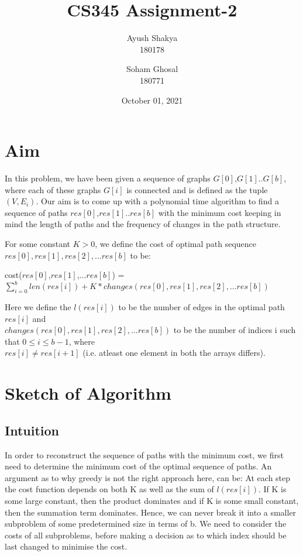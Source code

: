 \documentclass{article}
\title{CS345 Assignment-2}
\author{Ayush Shakya \\180178 \and Soham Ghosal \\180771}
\date{October 01, 2021}
\begin{document}
\maketitle

\vspace{0.25cm}
\section{Aim}
In this problem, we have been given a sequence of graphs $G[0]$,$G[1]$..$G[b]$, where each of these graphs $G[i]$ is connected and is defined as the tuple $(V,E_{i})$. Our aim is to come up with a polynomial time algorithm to find a sequence of paths $res[0]$,$res[1]$..$res[b]$ with the minimum cost keeping in mind the length of paths and the frequency of changes in the path structure.
\par
For some constant $K>0$, we define the cost of optimal path sequence $res[0] ,res[1] ,res[2] ,...res[b]$ to be:
\begin{center}
    cost($res[0]$,$res[1]$,...$res[b]$) = 
$\displaystyle \sum _{i=0}^{b} len(res[i]) +K*changes( res[0] ,res[1] ,res[2] ,...res[b])_{\ }$
\end{center}
Here we define the $l(res[i])$ to be the number of edges in the optimal path $res[i]$ and \\ $changes(res[0] ,res[1] ,res[2] ,...res[b])$ to be the number of indices i such that $0 \leq i \leq b-1$, where \\ $res[i] \neq res[i+1]$ (i.e. atleast one element in both the arrays differs).

\vspace{0cm}


\section{Sketch of Algorithm}

\subsection{Intuition}
In order to reconstruct the sequence of paths with the minimum cost, we first need to determine the minimum cost of the optimal sequence of paths. An argument as to why greedy is not the right approach here, can be: At each step the cost function depends on both K as well as the sum of $l(res[i])$. If K is some large constant, then the product dominates and if K is some small constant, then the summation term dominates. Hence, we can never break it into a smaller subproblem of some predetermined size in terms of b. We need to consider the costs of all subproblems, before making a decision as to which index should be last changed to minimise the cost. 
\end{document}
